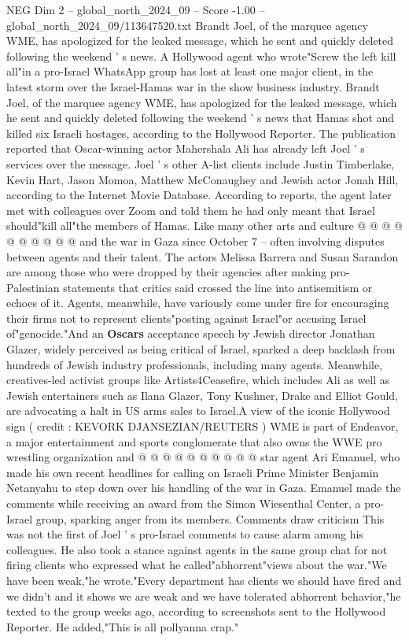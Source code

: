 \begin{textsample}{NEG Dim 2 – global\_north\_2024\_09 – Score -1.00 – global\_north\_2024\_09/113647520.txt}  \label{ex:f2_neg_315}
Brandt Joel, of the marquee agency WME, has apologized for the leaked message, which he sent and quickly deleted following the weekend ' s news.
A Hollywood agent who wrote"Screw the left kill all"in a pro-Israel WhatsApp group has lost at least one major client, in the latest storm over the Israel-Hamas war in the show business industry.
Brandt Joel, of the marquee agency WME, has apologized for the leaked message, which he sent and quickly deleted following the weekend ' s news that Hamas shot and killed six Israeli hostages, according to the Hollywood Reporter.
The publication reported that Oscar-winning actor Mahershala Ali has already left Joel ' s services over the message.
Joel ' s other A-list clients include Justin Timberlake, Kevin Hart, Jason Momoa, Matthew McConaughey and Jewish actor Jonah Hill, according to the Internet Movie Database.
According to reports, the agent later met with colleagues over Zoom and told them he had only meant that Israel should"kill all"the members of Hamas.
Like many other arts and culture @ @ @ @ @ @ @ @ @ @ and the war in Gaza since October 7 -- often involving disputes between agents and their talent.
The actors Melissa Barrera and Susan Sarandon are among those who were dropped by their agencies after making pro-Palestinian statements that critics said crossed the line into antisemitism or echoes of it.
Agents, meanwhile, have variously come under fire for encouraging their firms not to represent clients"posting against Israel"or accusing Israel of"genocide."And an \textbf{Oscars} acceptance speech by Jewish director Jonathan Glazer, widely perceived as being critical of Israel, sparked a deep backlash from hundreds of Jewish industry professionals, including many agents.
Meanwhile, creatives-led activist groups like Artists4Ceasefire, which includes Ali as well as Jewish entertainers such as Ilana Glazer, Tony Kushner, Drake and Elliot Gould, are advocating a halt in US arms sales to Israel.A view of the iconic Hollywood sign ( credit : KEVORK DJANSEZIAN/REUTERS ) WME is part of Endeavor, a major entertainment and sports conglomerate that also owns the WWE pro wrestling organization and @ @ @ @ @ @ @ @ @ @ star agent Ari Emanuel, who made his own recent headlines for calling on Israeli Prime Minister Benjamin Netanyahu to step down over his handling of the war in Gaza.
Emanuel made the comments while receiving an award from the Simon Wiesenthal Center, a pro-Israel group, sparking anger from its members.
Comments draw criticism This was not the first of Joel ' s pro-Israel comments to cause alarm among his colleagues.
He also took a stance against agents in the same group chat for not firing clients who expressed what he called"abhorrent"views about the war."We have been weak,"he wrote."Every department has clients we should have fired and we didn't and it shows we are weak and we have tolerated abhorrent behavior,"he texted to the group weeks ago, according to screenshots sent to the Hollywood Reporter.
He added,"This is all pollyanna crap."

\end{textsample}
